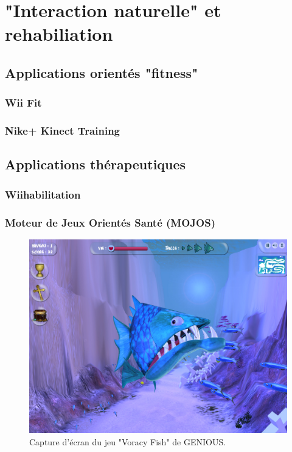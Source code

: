 
\section{"Interaction naturelle" et rehabiliation}
  
\subsection{Applications orientés "fitness"}
\subsubsection{Wii Fit}
\subsubsection{Nike+ Kinect Training}


\subsection{Applications thérapeutiques}

\subsubsection{Wiihabilitation}

\subsubsection{Moteur de Jeux Orientés Santé (MOJOS)}

\begin{figure}[h!]
\centering
\includegraphics[width=0.8\linewidth]{images/voracy_fish}
\caption{Capture d'écran du jeu "Voracy Fish" de GENIOUS.}
\end{figure}

